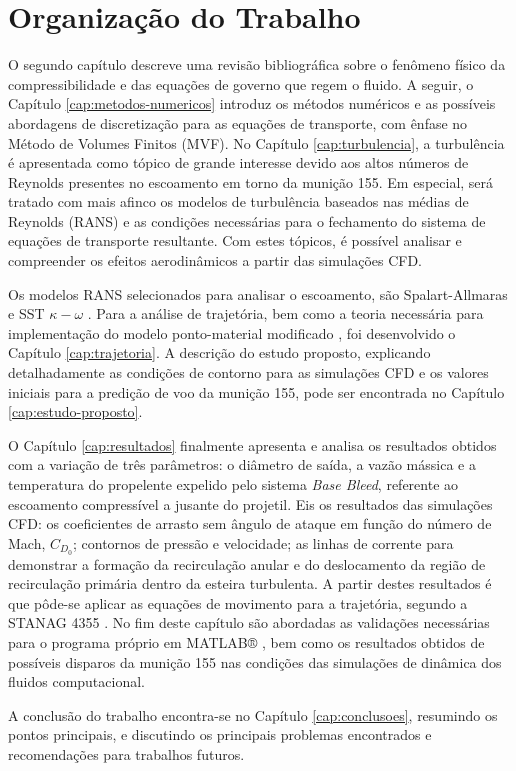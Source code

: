 \section{Organização do Trabalho}

O segundo capítulo descreve uma revisão bibliográfica sobre o fenômeno físico da compressibilidade e das equações de governo que regem o fluido. A seguir, o Capítulo \ref{cap:metodos-numericos} introduz os métodos numéricos e as possíveis abordagens de discretização para as equações de transporte, com ênfase no Método de Volumes Finitos (MVF). No Capítulo \ref{cap:turbulencia}, a turbulência é apresentada como tópico de grande interesse devido aos altos números de Reynolds presentes no escoamento em torno da munição \qty{155}{\millimetre}. Em especial, será tratado com mais afinco os modelos de turbulência baseados nas médias de Reynolds (RANS) e as condições necessárias para o fechamento do sistema de equações de transporte resultante. Com estes tópicos, é possível analisar e compreender os efeitos aerodinâmicos a partir das simulações CFD.

Os modelos RANS selecionados para analisar o escoamento, são Spalart-Allmaras \cite{Spalart1992} e SST \(\kappa-\omega\) \cite{Menter1994TwoequationET,Menter2003,Menter2009}. Para a análise de trajetória, bem como a teoria necessária para implementação do modelo ponto-material modificado \cite{stanag4355}, foi desenvolvido o Capítulo \ref{cap:trajetoria}. A descrição do estudo proposto, explicando detalhadamente as condições de contorno para as simulações CFD e os valores iniciais para a predição de voo da munição \qty{155}{\millimetre}, pode ser encontrada no Capítulo \ref{cap:estudo-proposto}.

O Capítulo \ref{cap:resultados} finalmente apresenta e analisa os resultados obtidos com a variação de três parâmetros: o diâmetro de saída, a vazão mássica e a temperatura do propelente expelido pelo sistema \textit{Base Bleed}, referente ao escoamento compressível a jusante do projetil. Eis os resultados das simulações CFD: os coeficientes de arrasto sem ângulo de ataque em função do número de Mach, \(C_{D_{0}}\); contornos de pressão e velocidade; as linhas de corrente para demonstrar a formação da recirculação anular e do deslocamento da região de recirculação primária dentro da esteira turbulenta. A partir destes resultados é que pôde-se aplicar as equações de movimento para a trajetória, segundo a STANAG 4355 \cite{stanag4355}. No fim deste capítulo são abordadas as validações necessárias para o programa próprio em MATLAB® \cite{ThallyoENCIT2022,Thallyo2022}, bem como os resultados obtidos de possíveis disparos da munição \qty{155}{\millimetre} nas condições das simulações de dinâmica dos fluidos computacional. 

A conclusão do trabalho encontra-se no Capítulo \ref{cap:conclusoes}, resumindo os pontos principais, e discutindo os principais problemas encontrados e recomendações para trabalhos futuros.